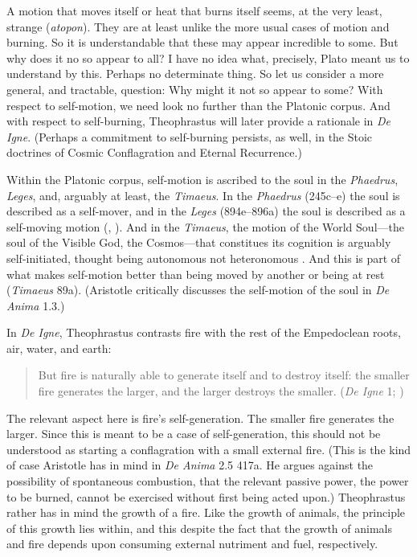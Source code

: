 A motion that moves itself or heat that burns itself seems, at the very least, strange (\emph{atopon}). They are at least unlike the more usual cases of motion and burning. So it is understandable that these may appear incredible to some. But why does it no so appear to all? I have no idea what, precisely, Plato meant us to understand by this. Perhaps no determinate thing. So let us consider a more general, and tractable, question: Why might it not so appear to some? With respect to self-motion, we need look no further than the Platonic corpus. And with respect to self-burning, Theophrastus will later provide a rationale in \emph{De Igne}. (Perhaps a commitment to self-burning persists, as well, in the Stoic doctrines of Cosmic Conflagration and Eternal Recurrence.)

Within the Platonic corpus, self-motion is ascribed to the soul in the \emph{Phaedrus}, \emph{Leges}, and, arguably at least, the \emph{Timaeus}. In the \emph{Phaedrus} (245c–e) the soul is described as a self-mover, and in the \emph{Leges} (894e–896a) the soul is described as a self-moving motion (\citealt[177–81]{Bruell:1977aa},  \citealt[311]{Halper:2000aa}). And in the \emph{Timaeus}, the motion of the World Soul—the soul of the Visible God, the Cosmos—that constitues its cognition is arguably self-initiated, thought being autonomous not heteronomous \citep[chapter 4]{Kalderon:2023aa}. And this is part of what makes self-motion better than being moved by another or being at rest (\emph{Timaeus} 89a). (Aristotle critically discusses the self-motion of the soul in \emph{De Anima} 1.3.)

In \emph{De Igne}, Theophrastus contrasts fire with the rest of the Empedoclean roots, air, water, and earth:
\begin{quote}
	But fire is naturally able to generate itself and to destroy itself: the smaller fire generates the larger, and the larger destroys the smaller. (\emph{De Igne} 1; \citealt[2]{Coutant:1971aa})
\end{quote}
The relevant aspect here is fire's self-generation. The smaller fire generates the larger. Since this is meant to be a case of self-generation, this should not be understood as starting a conflagration with a small external fire. (This is the kind of case Aristotle has in mind in \emph{De Anima} 2.5 417a. He argues against the possibility of spontaneous combustion, that the relevant passive power, the power to be burned, cannot be exercised without first being acted upon.) Theophrastus rather has in mind the growth of a fire. Like the growth of animals, the principle of this growth lies within, and this despite the fact that the growth of animals and fire depends upon consuming external nutriment and fuel, respectively.

